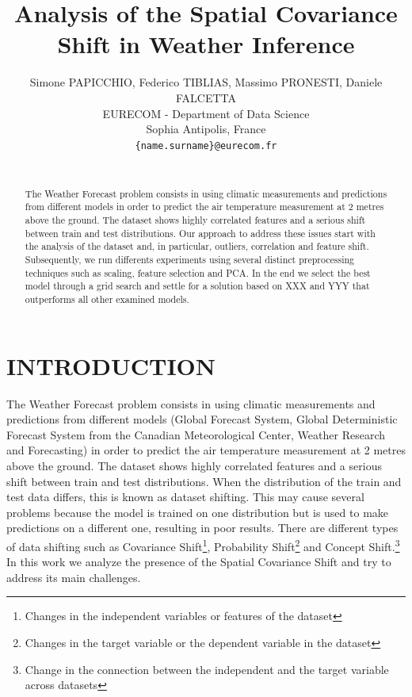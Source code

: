 \documentclass[letterpaper, 10 pt, conference]{ieeeconf}
\title{\LARGE \bf
Analysis of the Spatial Covariance Shift in Weather Inference
}
\author{Simone PAPICCHIO, Federico TIBLIAS, Massimo PRONESTI, Daniele FALCETTA%
\\EURECOM - Department of Data Science \\
Sophia Antipolis, France\\
{\tt\small\{name.surname\}@eurecom.fr} \\ \\
}
\begin{document}
    \maketitle
    \thispagestyle{plain}
    \pagestyle{plain}


\begin{abstract}
   The Weather Forecast problem consists in using climatic measurements and predictions from different models in order to predict the air temperature measurement at 2 metres above the ground. The dataset shows highly correlated features and a serious shift between train and test distributions. Our approach to address these issues start with the analysis of the dataset and, in particular, outliers, correlation and feature shift. Subsequently, we run differents experiments using several distinct preprocessing techniques such as scaling, feature selection and PCA. In the end we select the best model through a grid search and settle for a solution based on XXX and YYY that outperforms all other examined models.
\end{abstract}

\section{INTRODUCTION}
    The Weather Forecast problem consists in using climatic measurements and predictions from different models (Global Forecast System, Global Deterministic Forecast System from the Canadian Meteorological Center, Weather Research and Forecasting) in order to predict the air temperature measurement at 2 metres above the ground. The dataset shows highly correlated features and a serious shift between train and test distributions.
    When the distribution of the train and test data differs, this is known as dataset shifting. This may cause several problems because the model is trained on one distribution but is used to make predictions on a different one, resulting in poor results. There are different types of data shifting such as 
    Covariance Shift\footnote{Changes in the independent variables or features of the dataset},
    Probability Shift\footnote{Changes in the target variable or the dependent variable in the dataset}
    and Concept Shift.\footnote{Change in the connection between the independent and the target variable across datasets}
    In this work we analyze the presence of the Spatial Covariance Shift and try to address its main challenges.
\end{document}
